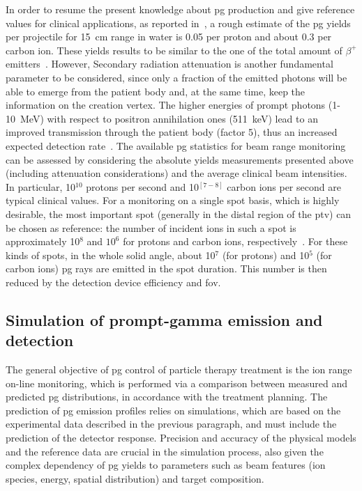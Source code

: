 In order to resume the present knowledge about \gls{pg} production and give reference values for clinical applications, as reported in~\cite{Krimmer2017}, a rough estimate of the \gls{pg} yields per projectile for 15~cm range in water is 0.05 per proton and about 0.3 per carbon ion. These yields results to be similar to the one of the total amount of $\beta^{+}$ emitters~\parencite{Pinto2015, Robert2013}. However, Secondary radiation attenuation is another fundamental parameter to be considered, since only a fraction of the emitted photons will be able to emerge from the patient body and, at the same time, keep the information on the creation vertex. The higher energies of prompt photons (1-10~MeV) with respect to positron annihilation ones (511~keV) lead to an improved transmission through the patient body (factor 5), thus an increased expected detection rate~\parencite{Moteabbed2011}. 
The available \gls{pg} statistics for beam range monitoring can be assessed by considering the absolute yields measurements presented above (including attenuation considerations) and the average clinical beam intensities. In particular, 10$^{10}$ protons per second and 10$^{[7-8]}$ carbon ions per second are typical clinical values. For a monitoring on a single spot basis, which is highly desirable, the most important spot (generally in the distal region of the \gls{ptv}) can be chosen as reference: the number of incident ions in such a spot is approximately 10$^8$ and $10^6$ for protons and carbon ions, respectively~\parencite{Kramer2000, Grevillot2012}. For these kinds of spots, in the whole solid angle, about 10$^7$ (for protons) and 10$^5$ (for carbon ions) \gls{pg} rays are emitted in the spot duration. This number is then reduced by the detection device efficiency and \gls{fov}. 

\subsection{Simulation of prompt-gamma emission and detection}\label{chap2::subsec::PGsimulation}

The general objective of \gls{pg} control of particle therapy treatment is the ion range on-line monitoring, which is performed via a comparison between measured and predicted \gls{pg} distributions, in accordance with the treatment planning. The prediction of \gls{pg} emission profiles relies on simulations, which are based on the experimental data described in the previous paragraph, and must include the prediction of the detector response. Precision and accuracy of the physical models and the reference data are crucial in the simulation process, also given the complex dependency of \gls{pg} yields to parameters such as beam features (ion species, energy, spatial distribution) and target composition. 

